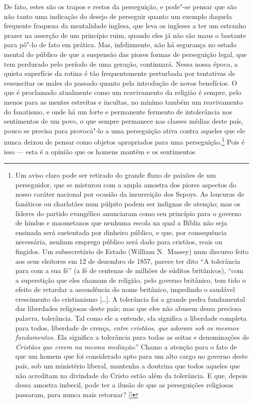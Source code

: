 De fato, estes são os trapos e restos da perseguição, e pode"-se
pensar que são não tanto uma indicação do desejo de 
perseguir quanto um exemplo daquela frequente fraqueza da mentalidade inglesa, que
leva os ingleses a ter um estranho prazer na asserção de um
princípio ruim, quando eles já não são maus o bastante para pô"-lo de
fato em prática. Mas, infelizmente, não há segurança no estado mental do
público de que a suspensão das piores formas de perseguição legal, que
tem perdurado pelo período de uma geração, continuará. Nessa nossa época, a
quieta superfície da rotina é tão frequentemente perturbada por
tentativas de ressuscitar os males do passado quanto pela introdução de
novos benefícios. O que é proclamado atualmente como um
reavivamento da religião é sempre, pelo menos para as mentes estreitas e
incultas, no mínimo também um reavivamento do fanatismo, e onde há um
forte e permanente fermento de intolerância nos sentimentos de um povo,
o que sempre permanece nas classes médias deste país, pouco se precisa
para provocá"-lo a uma perseguição ativa contra aqueles que ele nunca
deixou de pensar como objetos apropriados para uma
perseguição.\footnote{ Um aviso claro pode ser retirado do grande fluxo de paixões de um
perseguidor, que se misturou com a ampla amostra dos piores aspectos do
nosso caráter nacional por ocasião da insurreição dos Sepoys. As
loucuras de fanáticos ou charlatães num púlpito podem ser indignas de
atenção; mas os líderes do partido evangélico anunciaram como seu
princípio para o governo de hindus e maometanos que
nenhuma escola na qual a Bíblia não seja ensinada será sustentada por
dinheiro público, e que, por consequência necessária, nenhum emprego
público será dado para cristãos, reais ou fingidos. Um
subsecretário de Estado (William N.~Massey) num discurso feito aos
seus eleitores em 12 de dezembro de 1857, parece ter dito ``A
tolerância para com a sua fé'' (a fé de centenas de milhões de súditos
britânicos), ``com a superstição que eles chamam de religião, pelo
governo britânico, tem tido o efeito de retardar a ascendência do nome
britânico, impedindo o saudável crescimento do cristianismo [\ldots]. A
tolerância foi a grande pedra fundamental das liberdades religiosas
deste país; mas que eles não abusem dessa preciosa palavra, tolerância.
Tal como ele a entende, ela significa a liberdade completa para todos,
liberdade de crença, \textit{entre cristãos, que adoram sob os mesmos
fundamentos}. Ela significa a tolerância para todas as seitas e
denominações de \textit{Cristãos que creem na mesma mediação}.'' Chamo a atenção
para o fato de que um homem que foi considerado apto para um alto cargo
no governo deste país, sob um ministério liberal, mantenha a doutrina
que todos aqueles que não acreditam na divindade do Cristo estão além
da tolerância. E que, depois dessa amostra imbecil, pode ter a
ilusão de que as perseguições religiosas passaram, para nunca mais
retornar? []}  Pois é isso --- esta é a opinião que os homens mantêm e os sentimentos
